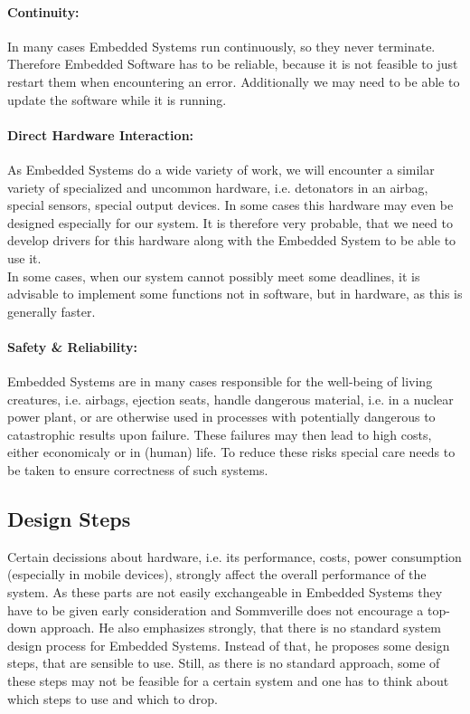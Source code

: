 \documentclass[10pt,a4paper,titlepage,draft]{report} %
\begin{document}
\paragraph{Continuity:}
In many cases Embedded Systems run continuously, so they never terminate.
Therefore Embedded Software has to be reliable, because it is not feasible to just restart them when encountering an error.
Additionally we may need to be able to update the software while it is running.

\paragraph{Direct Hardware Interaction:}
As Embedded Systems do a wide variety of work, we will encounter a similar variety of specialized and uncommon hardware, i.e. detonators in an airbag, special sensors, special output devices.
In some cases this hardware may even be designed especially for our system.
It is therefore very probable, that we need to develop drivers for this hardware along with the Embedded System to be able to use it.\\
In some cases, when our system cannot possibly meet some deadlines, it is advisable to implement some functions not in software, but in hardware, as this is generally faster.

\paragraph{Safety \& Reliability:}
Embedded Systems are in many cases responsible for the well-being of living creatures, i.e. airbags, ejection seats, handle dangerous material, i.e. in a nuclear power plant, or are otherwise used in processes with potentially dangerous to catastrophic results upon failure.
These failures may then lead to high costs, either economicaly or in (human) life.
To reduce these risks special care needs to be taken to ensure correctness of such systems.

\subsection{Design Steps}
Certain decissions about hardware, i.e. its performance, costs, power consumption (especially in mobile devices), strongly affect the overall performance of the system.
As these parts are not easily exchangeable in Embedded Systems they have to be given early consideration and Sommverille does not encourage a top-down approach.
He also emphasizes strongly, that there is no standard system design process for Embedded Systems.
Instead of that, he proposes some design steps, that are sensible to use.
Still, as there is no standard approach, some of these steps may not be feasible for a certain system and one has to think about which steps to use and which to drop.
\end{document}
